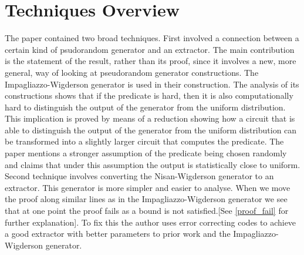 \section{Techniques Overview}
The paper contained two broad techniques. First involved a connection between a certain kind of psudorandom generator and an extractor. The main contribution is the statement of the result, rather than its proof, since it involves a new, more general, way of looking at pseudorandom generator constructions. The Impagliazzo-Wigderson generator \cite{Impagliazzo:1997:PBE:258533.258590} is used in their construction. The analysis of its constructions shows that if the predicate is hard, then it is also computationally hard to distinguish the output of the generator from the uniform distribution. This implication is proved by means of a reduction showing how a circuit that is able to distinguish the output of the generator from the uniform distribution can be transformed into a slightly larger circuit that computes the predicate. The paper mentions a stronger assumption of the predicate being chosen randomly and claims that under this assumption the output is statistically close to uniform. 
\\
Second technique involves converting the Nisan-Wigderson generator \cite{Nisan:1994:HVR:192095.192097} to an extractor. This generator is more simpler and easier to analyse. When we move the proof along similar lines as in the Impagliazzo-Wigderson generator we see that at one point the proof fails as a bound is not satisfied.[See \ref{proof_fail} for further explanation]. To fix this the author uses error correcting codes to achieve a good extractor with better parameters to prior work and the Impagliazzo-Wigderson generator.